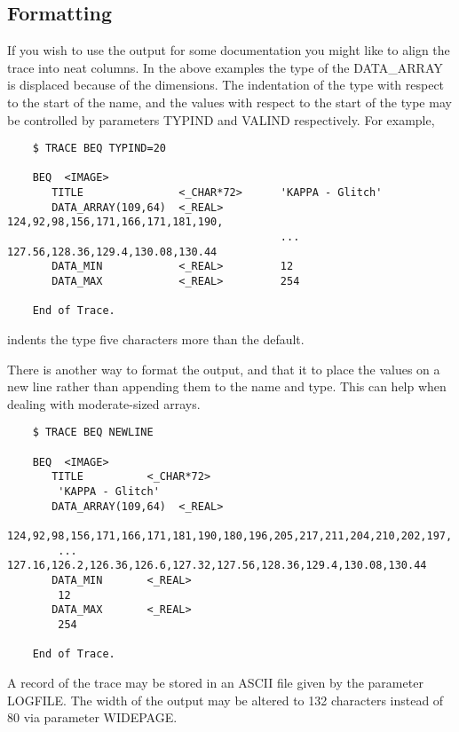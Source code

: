 \subsection{Formatting}
If you wish to use the output for some documentation you might like
to align the trace into neat columns.  In the above examples the
type of the DATA\_ARRAY is displaced because of the dimensions.  The
indentation of the type with respect to the start of the name, and the
values with respect to the start of the type may be controlled by 
parameters TYPIND and VALIND respectively.  For example,
\small
\begin{verbatim}
    $ TRACE BEQ TYPIND=20
 
    BEQ  <IMAGE>
       TITLE               <_CHAR*72>      'KAPPA - Glitch'
       DATA_ARRAY(109,64)  <_REAL>         124,92,98,156,171,166,171,181,190,
                                           ... 127.56,128.36,129.4,130.08,130.44
       DATA_MIN            <_REAL>         12
       DATA_MAX            <_REAL>         254

    End of Trace.
\end{verbatim}
\normalsize
indents the type five characters more than the default.

There is another way to format the output, and that it to place the
values on a new line rather than appending them to the name and type.
This can help when dealing with moderate-sized arrays.
\small
\begin{verbatim}
    $ TRACE BEQ NEWLINE
 
    BEQ  <IMAGE>
       TITLE          <_CHAR*72>   
        'KAPPA - Glitch'
       DATA_ARRAY(109,64)  <_REAL>   
        124,92,98,156,171,166,171,181,190,180,196,205,217,211,204,210,202,197,
        ... 127.16,126.2,126.36,126.6,127.32,127.56,128.36,129.4,130.08,130.44
       DATA_MIN       <_REAL>   
        12
       DATA_MAX       <_REAL>   
        254

    End of Trace.
\end{verbatim}
\normalsize
A record of the trace may be stored in an ASCII file given by the 
parameter LOGFILE.  The width of the output may be altered to 132
characters instead of 80 via parameter WIDEPAGE.

